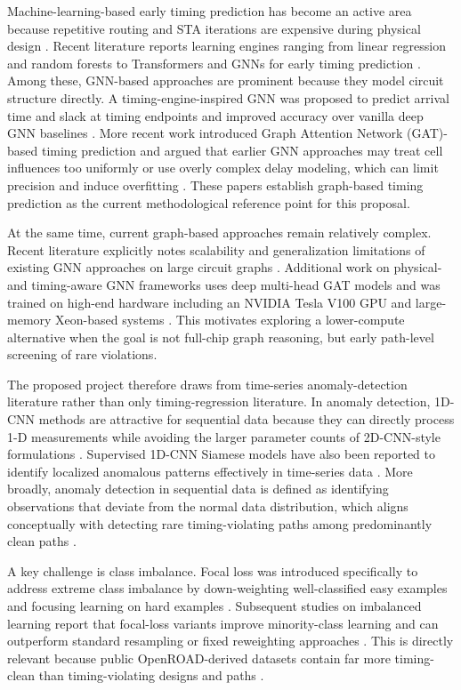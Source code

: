 \documentclass[12pt,a4paper]{article}
\begin{document}
Machine-learning-based early timing prediction has become an active area because repetitive routing and STA iterations are expensive during physical design \cite{Guo2022TimingEngine}. Recent literature reports learning engines ranging from linear regression and random forests to Transformers and GNNs for early timing prediction \cite{Ding2024PTAGNN,Cao2025GNNGuidance}. Among these, GNN-based approaches are prominent because they model circuit structure directly. A timing-engine-inspired GNN was proposed to predict arrival time and slack at timing endpoints and improved accuracy over vanilla deep GNN baselines \cite{Guo2022TimingEngine}. More recent work introduced Graph Attention Network (GAT)-based timing prediction and argued that earlier GNN approaches may treat cell influences too uniformly or use overly complex delay modeling, which can limit precision and induce overfitting \cite{Li2025GATSlack}. These papers establish graph-based timing prediction as the current methodological reference point for this proposal.

At the same time, current graph-based approaches remain relatively complex. Recent literature explicitly notes scalability and generalization limitations of existing GNN approaches on large circuit graphs \cite{Li2025GATSlack}. Additional work on physical- and timing-aware GNN frameworks uses deep multi-head GAT models and was trained on high-end hardware including an NVIDIA Tesla V100 GPU and large-memory Xeon-based systems \cite{Ding2024PTAGNN}. This motivates exploring a lower-compute alternative when the goal is not full-chip graph reasoning, but early path-level screening of rare violations.

The proposed project therefore draws from time-series anomaly-detection literature rather than only timing-regression literature. In anomaly detection, 1D-CNN methods are attractive for sequential data because they can directly process 1-D measurements while avoiding the larger parameter counts of 2D-CNN-style formulations \cite{Gong2022FastAnomaly}. Supervised 1D-CNN Siamese models have also been reported to identify localized anomalous patterns effectively in time-series data \cite{Chatterjee2024ADSiamNet}. More broadly, anomaly detection in sequential data is defined as identifying observations that deviate from the normal data distribution, which aligns conceptually with detecting rare timing-violating paths among predominantly clean paths \cite{Kim2023Transformer1DCNN}.

A key challenge is class imbalance. Focal loss was introduced specifically to address extreme class imbalance by down-weighting well-classified easy examples and focusing learning on hard examples \cite{Lin2017FocalLoss}. Subsequent studies on imbalanced learning report that focal-loss variants improve minority-class learning and can outperform standard resampling or fixed reweighting approaches \cite{Mahmoodi2024AWFL,Su2024AFL}. This is directly relevant because public OpenROAD-derived datasets contain far more timing-clean than timing-violating designs and paths \cite{Shrestha2026EDASchemaV2}.
\end{document}
